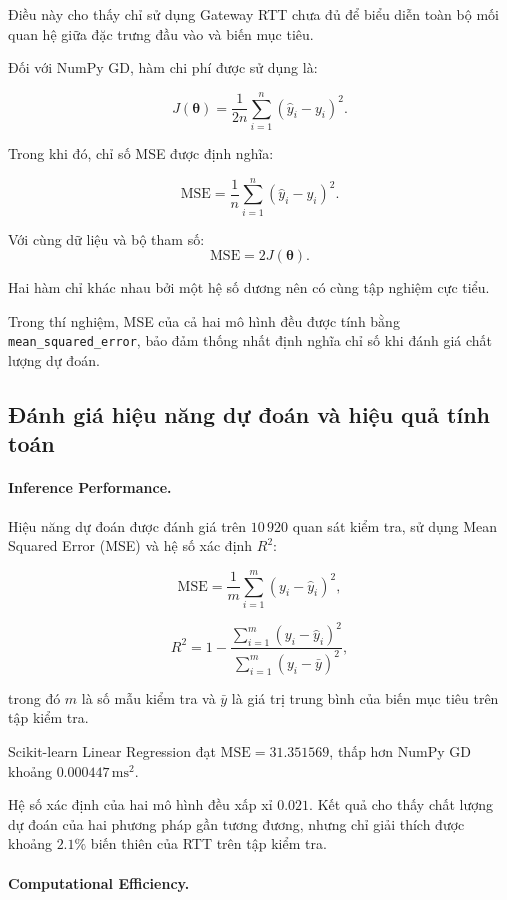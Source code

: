 Điều này cho thấy chỉ sử dụng Gateway RTT
chưa đủ để biểu diễn toàn bộ mối quan hệ
giữa đặc trưng đầu vào và biến mục tiêu.

Đối với NumPy GD, hàm chi phí được sử dụng là:

\[
    J(\boldsymbol{\theta})
    =
    \frac{1}{2n}
    \sum_{i=1}^{n}
    (\hat{y}_i-y_i)^2.
\]

Trong khi đó, chỉ số MSE được định nghĩa:

\[
    \mathrm{MSE}
    =
    \frac{1}{n}
    \sum_{i=1}^{n}
    (\hat{y}_i-y_i)^2.
\]

Với cùng dữ liệu và bộ tham số:
\[
    \boxed{
        \mathrm{MSE}=2J(\boldsymbol{\theta})
    }.
\]

Hai hàm chỉ khác nhau bởi một hệ số dương
nên có cùng tập nghiệm cực tiểu.

Trong thí nghiệm, MSE của cả hai mô hình
đều được tính bằng
\texttt{mean\_squared\_error},
bảo đảm thống nhất định nghĩa chỉ số
khi đánh giá chất lượng dự đoán.


\subsection{Đánh giá hiệu năng dự đoán
và hiệu quả tính toán}

\paragraph{Inference Performance.}

Hiệu năng dự đoán được đánh giá trên
$10\,920$ quan sát kiểm tra,
sử dụng Mean Squared Error (MSE)
và hệ số xác định $R^2$:

\[
    \mathrm{MSE}
    =
    \frac{1}{m}
    \sum_{i=1}^{m}
    (y_i-\hat{y}_i)^2,
\]

\[
    R^2
    =
    1-
    \frac{
        \sum_{i=1}^{m}(y_i-\hat{y}_i)^2
    }{
        \sum_{i=1}^{m}(y_i-\bar{y})^2
    },
\]

trong đó $m$ là số mẫu kiểm tra
và $\bar{y}$ là giá trị trung bình
của biến mục tiêu trên tập kiểm tra.

Scikit-learn Linear Regression đạt
$\mathrm{MSE}=31.351569$,
thấp hơn NumPy GD khoảng
$0.000447\,\mathrm{ms}^2$.

Hệ số xác định của hai mô hình
đều xấp xỉ $0.021$.
Kết quả cho thấy chất lượng dự đoán
của hai phương pháp gần tương đương,
nhưng chỉ giải thích được khoảng
$2.1\%$ biến thiên của RTT
trên tập kiểm tra.

\paragraph{Computational Efficiency.}

